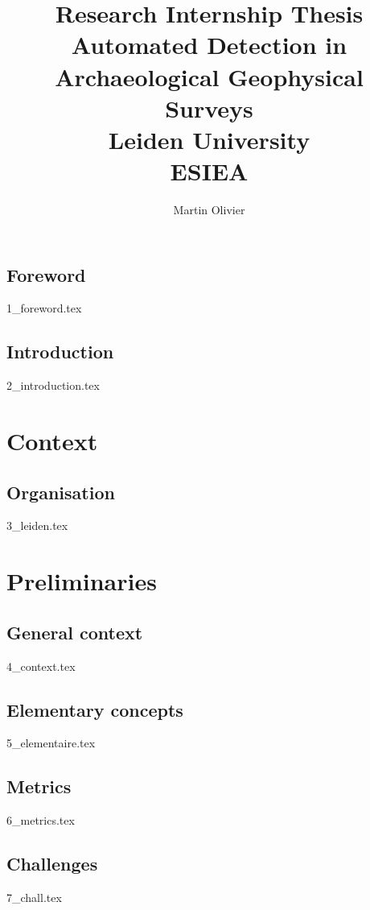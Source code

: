 \documentclass[a4paper, 12pt, titlepage, oneside]{report}
\author{Martin Olivier}
\title{Research Internship Thesis\\
\large Automated Detection in Archaeological Geophysical Surveys\\
\textbf{Leiden University}\\
	ESIEA
}
\begin{document}
\maketitle

\tableofcontents
\newpage

\listoffigures
\newpage

\listoftables
\newpage

\chapter{Foreword}
{1_foreword.tex}
\newpage

\chapter{Introduction}
{2_introduction.tex}
\newpage

\part{Context}
\chapter{Organisation}
{3_leiden.tex}
\newpage

\part{Preliminaries}
\chapter{General context}%
{4_context.tex}
\newpage

\chapter{Elementary concepts}\label{elementaire}
{5_elementaire.tex}
\newpage

\chapter{Metrics}
{6_metrics.tex}
\newpage

\chapter{Challenges}\label{challenges}
{7_chall.tex}
\newpage
\end{document}
